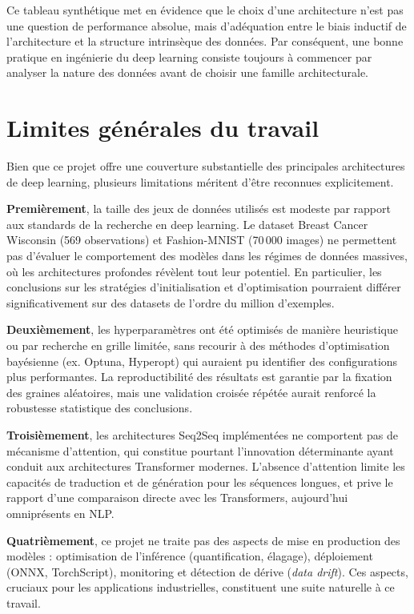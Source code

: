 \documentclass[11pt,a4paper]{article}
\begin{document}
Ce tableau synthétique met en évidence que le choix d'une architecture n'est pas une
question de performance absolue, mais d'adéquation entre le biais inductif de l'architecture
et la structure intrinsèque des données. Par conséquent, une bonne pratique en ingénierie
du deep learning consiste toujours à commencer par analyser la nature des données avant
de choisir une famille architecturale.

\section{Limites générales du travail}

Bien que ce projet offre une couverture substantielle des principales architectures
de deep learning, plusieurs limitations méritent d'être reconnues explicitement.

\textbf{Premièrement}, la taille des jeux de données utilisés est modeste par rapport
aux standards de la recherche en deep learning. Le dataset Breast Cancer Wisconsin
(569 observations) et Fashion-MNIST (70\,000 images) ne permettent pas d'évaluer le
comportement des modèles dans les régimes de données massives, où les architectures
profondes révèlent tout leur potentiel. En particulier, les conclusions sur les
stratégies d'initialisation et d'optimisation pourraient différer significativement
sur des datasets de l'ordre du million d'exemples.

\textbf{Deuxièmement}, les hyperparamètres ont été optimisés de manière heuristique
ou par recherche en grille limitée, sans recourir à des méthodes d'optimisation
bayésienne (ex. Optuna, Hyperopt) qui auraient pu identifier des configurations
plus performantes. La reproductibilité des résultats est garantie par la fixation
des graines aléatoires, mais une validation croisée répétée aurait renforcé la
robustesse statistique des conclusions.

\textbf{Troisièmement}, les architectures Seq2Seq implémentées ne comportent pas de
mécanisme d'attention, qui constitue pourtant l'innovation déterminante ayant conduit
aux architectures Transformer modernes. L'absence d'attention limite les capacités de
traduction et de génération pour les séquences longues, et prive le rapport d'une
comparaison directe avec les Transformers, aujourd'hui omniprésents en NLP.

\textbf{Quatrièmement}, ce projet ne traite pas des aspects de mise en production des
modèles : optimisation de l'inférence (quantification, élagage), déploiement (ONNX,
TorchScript), monitoring et détection de dérive (\textit{data drift}). Ces aspects,
cruciaux pour les applications industrielles, constituent une suite naturelle à ce travail.
\end{document}
